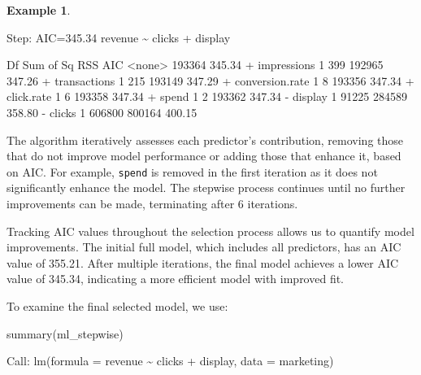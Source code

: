\documentclass[
  11pt,
]{book}
\makeatletter
\newenvironment{Shaded}{}{}
\newcommand{\AttributeTok}[1]{#1}
\newcommand{\DecValTok}[1]{#1}
\newcommand{\FloatTok}[1]{#1}
\newcommand{\FunctionTok}[1]{#1}
\newcommand{\NormalTok}[1]{#1}
\newcommand{\OtherTok}[1]{\textcolor[rgb]{0.39,0.39,0.39}{#1}}
\newcommand{\SpecialCharTok}[1]{\textcolor[rgb]{0.39,0.39,0.39}{#1}}
\newenvironment{kframe}{%
\medskip{}
\setlength{\fboxsep}{.8em}
 \def\at@end@of@kframe{}%
 \ifinner\ifhmode%
  \def\at@end@of@kframe{\end{minipage}}%
  \begin{minipage}{\columnwidth}%
 \fi\fi%
 \def\FrameCommand##1{\hskip\@totalleftmargin \hskip-\fboxsep
 \colorbox{shadecolor}{##1}\hskip-\fboxsep
     \hskip-\linewidth \hskip-\@totalleftmargin \hskip\columnwidth}%
 \MakeFramed {\advance\hsize-\width
   \@totalleftmargin\z@ \linewidth\hsize
   \@setminipage}}%
 {\par\unskip\endMakeFramed%
 \at@end@of@kframe}
\renewenvironment{Shaded}{\begin{kframe}}{\end{kframe}}
\theoremstyle{definition}
\theoremstyle{definition}
\newtheorem{example}{Example}[chapter]
\theoremstyle{definition}
\theoremstyle{definition}
\theoremstyle{remark}
\makeatother
\begin{document}
\begin{example}
\begin{Shaded}
\begin{Highlighting}[]
\NormalTok{   Step}\SpecialCharTok{:}\NormalTok{  AIC}\OtherTok{=}\FloatTok{345.34}
\NormalTok{   revenue }\SpecialCharTok{\textasciitilde{}}\NormalTok{ clicks }\SpecialCharTok{+}\NormalTok{ display}
   
\NormalTok{                     Df Sum of Sq    RSS    AIC}
   \SpecialCharTok{\textless{}}\NormalTok{none}\SpecialCharTok{\textgreater{}}                         \DecValTok{193364} \FloatTok{345.34}
   \SpecialCharTok{+}\NormalTok{ impressions      }\DecValTok{1}       \DecValTok{399} \DecValTok{192965} \FloatTok{347.26}
   \SpecialCharTok{+}\NormalTok{ transactions     }\DecValTok{1}       \DecValTok{215} \DecValTok{193149} \FloatTok{347.29}
   \SpecialCharTok{+}\NormalTok{ conversion.rate  }\DecValTok{1}         \DecValTok{8} \DecValTok{193356} \FloatTok{347.34}
   \SpecialCharTok{+}\NormalTok{ click.rate       }\DecValTok{1}         \DecValTok{6} \DecValTok{193358} \FloatTok{347.34}
   \SpecialCharTok{+}\NormalTok{ spend            }\DecValTok{1}         \DecValTok{2} \DecValTok{193362} \FloatTok{347.34}
   \SpecialCharTok{{-}}\NormalTok{ display          }\DecValTok{1}     \DecValTok{91225} \DecValTok{284589} \FloatTok{358.80}
   \SpecialCharTok{{-}}\NormalTok{ clicks           }\DecValTok{1}    \DecValTok{606800} \DecValTok{800164} \FloatTok{400.15}
\end{Highlighting}
\end{Shaded}

The algorithm iteratively assesses each predictor's contribution, removing those that do not improve model performance or adding those that enhance it, based on AIC. For example, \texttt{spend} is removed in the first iteration as it does not significantly enhance the model. The stepwise process continues until no further improvements can be made, terminating after 6 iterations.

Tracking AIC values throughout the selection process allows us to quantify model improvements. The initial full model, which includes all predictors, has an AIC value of 355.21. After multiple iterations, the final model achieves a lower AIC value of 345.34, indicating a more efficient model with improved fit.

To examine the final selected model, we use:

\begin{Shaded}
\begin{Highlighting}[]
\FunctionTok{summary}\NormalTok{(ml\_stepwise)}
   
\NormalTok{   Call}\SpecialCharTok{:}
   \FunctionTok{lm}\NormalTok{(}\AttributeTok{formula =}\NormalTok{ revenue }\SpecialCharTok{\textasciitilde{}}\NormalTok{ clicks }\SpecialCharTok{+}\NormalTok{ display, }\AttributeTok{data =}\NormalTok{ marketing)}
   

\end{Highlighting}
\end{Shaded}
\end{example}
\end{document}
